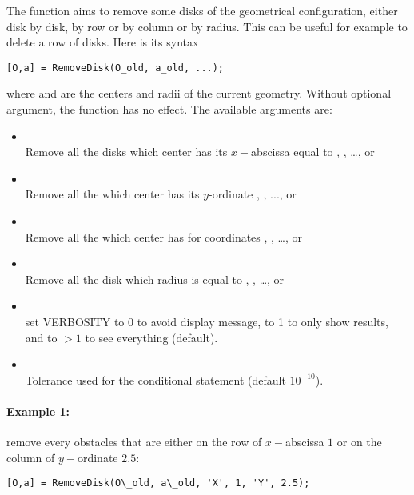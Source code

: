 The function  aims to remove some disks of the geometrical configuration, either disk by disk, by row or by column or by radius. This can be useful for example to delete a row of disks. Here is its syntax
\begin{verbatim}
[O,a] = RemoveDisk(O_old, a_old, ...);
\end{verbatim}
where  and  are the centers and radii of the current geometry. Without optional argument, the function has no effect. The available arguments are:
\begin{itemize}
\item {}\\
Remove all the disks which center has its $x-$abscissa equal to , , \ldots, or 
\item {}\\
Remove all the which center has its $y$-ordinate , , ..., or 
\item {}\\
Remove all the which center has for coordinates \code{[X1;Y1]}, \code{[X2;Y2]}, \ldots, or \code{[XN;YN]}
\item {}\\
Remove all the disk which radius is equal to , , \ldots, or 
\item {}\\
set VERBOSITY to 0 to avoid display message, to 1 to only show results, and to $>1$ to see everything (default).
\item {}\\
Tolerance used for the conditional statement (default $10^{-10}$).
\end{itemize}

\paragraph{Example 1:} remove every obstacles that are either on the row of $x-$abscissa $1$ or on the column of $y-$ordinate $2.5$:
\begin{verbatim}
[O,a] = RemoveDisk(O\_old, a\_old, 'X', 1, 'Y', 2.5);
\end{verbatim}
